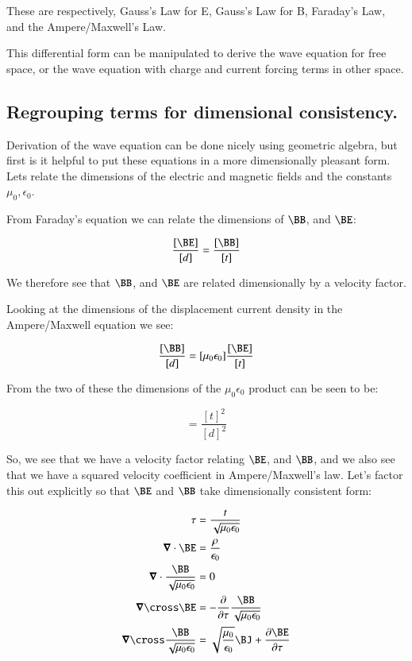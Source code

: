 These are respectively, Gauss's Law for E, Gauss's Law for B, Faraday's Law, and the Ampere/Maxwell's Law.

This differential form can be manipulated to derive the wave equation for free space, or the wave equation with charge and current forcing terms in other space.

\subsection{Regrouping terms for dimensional consistency. }

Derivation of the wave equation can be done nicely using geometric algebra, but first is it helpful to put these equations in a more dimensionally pleasant form.
Lets relate the dimensions of the electric and magnetic fields and the constants $\mu_0, \epsilon_0$.

From Faraday's equation we can relate the dimensions of
$\BB$, and $\BE$:

\begin{equation}
\frac{[\BE]}{[d]} = \frac{[\BB]}{[t]}
\end{equation}

We therefore see that $\BB$, and $\BE$ are related dimensionally by a velocity factor.

Looking at the dimensions of the displacement current density in the Ampere/Maxwell equation we see:

\begin{equation}
\frac{[\BB]}{[d]} = [\mu_0\epsilon_0] \frac{[\BE]}{[t]}
\end{equation}

From the two of these the dimensions of the $\mu_0\epsilon_0$ product can be seen to be:

\begin{equation}
[\mu_0\epsilon_0] = \frac{{[t]}^2}{{[d]}^2}
\end{equation}

So, we see that we have a velocity factor relating $\BE$, and $\BB$, and we also see that we have a squared velocity coefficient in Ampere/Maxwell's law.  Let's factor this out explicitly so that $\BE$ and $\BB$ take dimensionally consistent form:

\begin{align}
\tau &= \frac{t}{\sqrt{\mu_0\epsilon_0}}  \\
\spacegrad \cdot \BE &= \frac{\rho}{\epsilon_0} \\
\spacegrad \cdot \frac{\BB}{\sqrt{\mu_0\epsilon_0}} &= 0 \\
\spacegrad \cross \BE &= - \frac{\partial}{\partial \tau} \frac{\BB}{\sqrt{\mu_0\epsilon_0}} \\
\spacegrad \cross \frac{\BB}{\sqrt{\mu_0\epsilon_0}} &= \sqrt{\frac{\mu_0}{\epsilon_0}} \BJ + \frac{\partial \BE}{\partial \tau}
\end{align}

